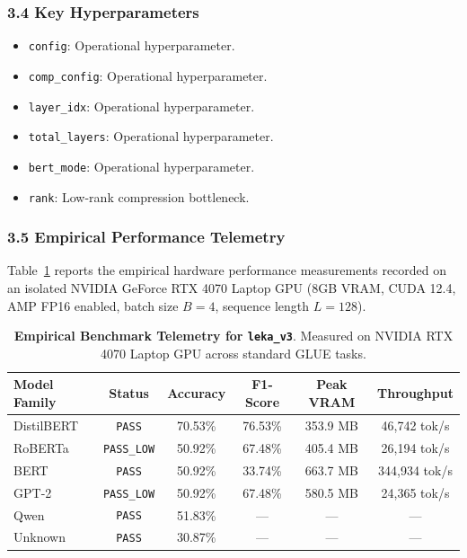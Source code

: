 \subsubsection*{3.4 Key Hyperparameters}
\begin{itemize}
    \item \texttt{config}: Operational hyperparameter.
    \item \texttt{comp\_config}: Operational hyperparameter.
    \item \texttt{layer\_idx}: Operational hyperparameter.
    \item \texttt{total\_layers}: Operational hyperparameter.
    \item \texttt{bert\_mode}: Operational hyperparameter.
    \item \texttt{rank}: Low-rank compression bottleneck.
\end{itemize}

\subsubsection*{3.5 Empirical Performance Telemetry}
Table~\ref{tab:telemetry_leka_v3} reports the empirical hardware performance measurements recorded on an isolated NVIDIA GeForce RTX 4070 Laptop GPU (8GB VRAM, CUDA 12.4, AMP FP16 enabled, batch size $B=4$, sequence length $L=128$).

\begin{table}[h]
\centering
\small
\caption{\textbf{Empirical Benchmark Telemetry for \texttt{leka\_v3}}. Measured on NVIDIA RTX 4070 Laptop GPU across standard GLUE tasks.}
\label{tab:telemetry_leka_v3}
\begin{tabular*}{\columnwidth}{@{\extracolsep{\fill}}lccccc}
\toprule
\textbf{Model Family} & \textbf{Status} & \textbf{Accuracy} & \textbf{F1-Score} & \textbf{Peak VRAM} & \textbf{Throughput} \\
\midrule
DistilBERT & \texttt{PASS} & 70.53\% & 76.53\% & 353.9 MB & 46,742 tok/s \\
RoBERTa & \texttt{PASS\_LOW} & 50.92\% & 67.48\% & 405.4 MB & 26,194 tok/s \\
BERT & \texttt{PASS} & 50.92\% & 33.74\% & 663.7 MB & 344,934 tok/s \\
GPT-2 & \texttt{PASS\_LOW} & 50.92\% & 67.48\% & 580.5 MB & 24,365 tok/s \\
Qwen & \texttt{PASS} & 51.83\% & --- & --- & --- \\
Unknown & \texttt{PASS} & 30.87\% & --- & --- & --- \\
\bottomrule
\end{tabular*}
\end{table}

